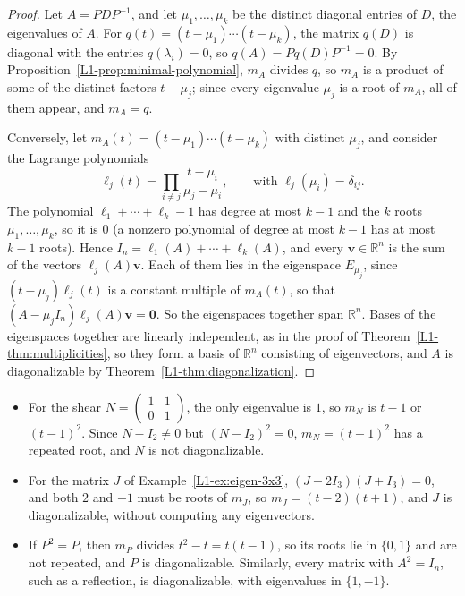 \begin{proof}
    Let $A = PDP^{-1}$, and let $\mu_1, \ldots, \mu_k$ be the distinct diagonal entries of $D$, the eigenvalues of $A$. For $q(t) = (t - \mu_1) \cdots (t - \mu_k)$, the matrix $q(D)$ is diagonal with the entries $q(\lambda_i) = 0$, so $q(A) = Pq(D)P^{-1} = 0$. By Proposition~\ref{L1-prop:minimal-polynomial}, $m_A$ divides $q$, so $m_A$ is a product of some of the distinct factors $t - \mu_j$; since every eigenvalue $\mu_j$ is a root of $m_A$, all of them appear, and $m_A = q$.

    Conversely, let $m_A(t) = (t - \mu_1) \cdots (t - \mu_k)$ with distinct $\mu_j$, and consider the Lagrange polynomials
    \[\ell_j(t) = \prod_{i \neq j} \frac{t - \mu_i}{\mu_j - \mu_i}, \qquad \text{with } \ell_j(\mu_i) = \delta_{ij}.\]
    The polynomial $\ell_1 + \cdots + \ell_k - 1$ has degree at most $k - 1$ and the $k$ roots $\mu_1, \ldots, \mu_k$, so it is $0$ (a nonzero polynomial of degree at most $k - 1$ has at most $k - 1$ roots). Hence $I_n = \ell_1(A) + \cdots + \ell_k(A)$, and every $\mathbf{v} \in \mathbb{R}^n$ is the sum of the vectors $\ell_j(A)\mathbf{v}$. Each of them lies in the eigenspace $E_{\mu_j}$, since $(t - \mu_j)\ell_j(t)$ is a constant multiple of $m_A(t)$, so that $(A - \mu_jI_n)\ell_j(A)\mathbf{v} = \mathbf{0}$. So the eigenspaces together span $\mathbb{R}^n$. Bases of the eigenspaces together are linearly independent, as in the proof of Theorem~\ref{L1-thm:multiplicities}, so they form a basis of $\mathbb{R}^n$ consisting of eigenvectors, and $A$ is diagonalizable by Theorem~\ref{L1-thm:diagonalization}.
\end{proof}

\begin{example}\label{L1-ex:minimal-polynomial}
    \begin{itemize}
        \item For the shear $N = \begin{pmatrix} 1 & 1 \\ 0 & 1 \end{pmatrix}$, the only eigenvalue is $1$, so $m_N$ is $t - 1$ or $(t - 1)^2$. Since $N - I_2 \neq 0$ but $(N - I_2)^2 = 0$, $m_N = (t - 1)^2$ has a repeated root, and $N$ is not diagonalizable.
        \item For the matrix $J$ of Example~\ref{L1-ex:eigen-3x3}, $(J - 2I_3)(J + I_3) = 0$, and both $2$ and $-1$ must be roots of $m_J$, so $m_J = (t - 2)(t + 1)$, and $J$ is diagonalizable, without computing any eigenvectors.
        \item If $P^2 = P$, then $m_P$ divides $t^2 - t = t(t - 1)$, so its roots lie in $\{0, 1\}$ and are not repeated, and $P$ is diagonalizable. Similarly, every matrix with $A^2 = I_n$, such as a reflection, is diagonalizable, with eigenvalues in $\{1, -1\}$.
    \end{itemize}
\end{example}

